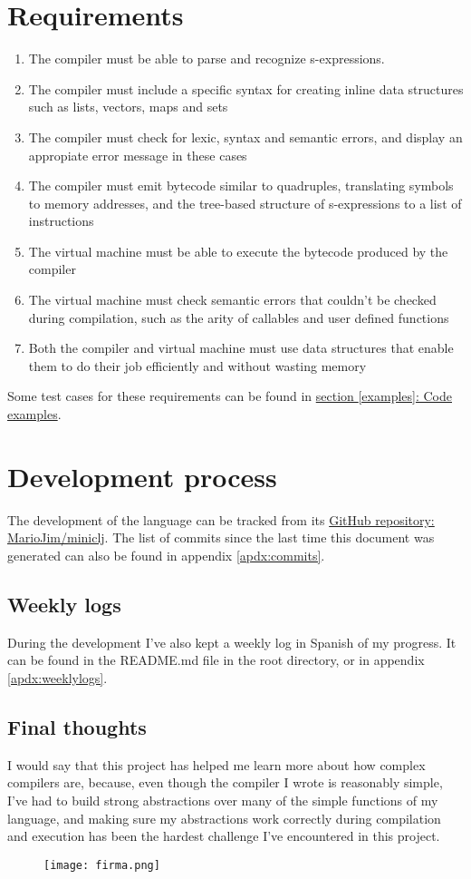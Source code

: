 \documentclass[11pt]{scrreprt}
\begin{document}
\section{Requirements}
\begin{enumerate}
  \item The compiler must be able to parse and recognize s-expressions.
  \item The compiler must include a specific syntax for creating inline data structures such as lists, vectors, maps and sets
  \item The compiler must check for lexic, syntax and semantic errors, and display an appropiate error message in these cases
  \item The compiler must emit bytecode similar to quadruples, translating symbols to memory addresses, and the tree-based structure of s-expressions to a list of instructions
  \item The virtual machine must be able to execute the bytecode produced by the compiler
  \item The virtual machine must check semantic errors that couldn't be checked during compilation, such as the arity of callables and user defined functions
  \item Both the compiler and virtual machine must use data structures that enable them to do their job efficiently and without wasting memory
\end{enumerate}

Some test cases for these requirements can be found in \hyperref[examples]{section \ref{examples}: Code examples}.

\section{Development process}
The development of the language can be tracked from its \href{https://github.com/MarioJim/miniclj}{GitHub repository: MarioJim/miniclj}. The list of commits since the last time this document was generated can also be found in appendix \ref{apdx:commits}.

\subsection{Weekly logs}
During the development I've also kept a weekly log in Spanish of my progress. It can be found in the README.md file in the root directory, or in appendix \ref{apdx:weeklylogs}.

\subsection{Final thoughts}
I would say that this project has helped me learn more about how complex compilers are, because, even though the compiler I wrote is reasonably simple, I've had to build strong abstractions over many of the simple functions of my language, and making sure my abstractions work correctly during compilation and execution has been the hardest challenge I've encountered in this project.
\begin{figure}[H]
  \texttt{[image: firma.png]}
\end{figure}
\end{document}

